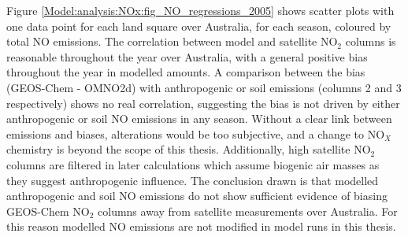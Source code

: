     Figure \ref{Model:analysis:NOx:fig_NO_regressions_2005} shows scatter plots with one data point for each land square over Australia, for each season, coloured by total NO emissions.
    The correlation between model and satellite NO$_2$ columns is reasonable throughout the year over Australia, with a general positive bias throughout the year in modelled amounts.
    A comparison between the bias (GEOS-Chem - OMNO2d) with anthropogenic or soil emissions (columns 2 and 3 respectively) shows no real correlation, suggesting the bias is not driven by either anthropogenic or soil NO emissions in any season.
    Without a clear link between emissions and biases, alterations would be too subjective, and a change to NO$_X$ chemistry is beyond the scope of this thesis.
    Additionally, high satellite NO$_2$ columns are filtered in later calculations which assume biogenic air masses as they suggest anthropogenic influence.
    The conclusion drawn is that modelled anthropogenic and soil NO emissions do not show sufficient evidence of biasing GEOS-Chem NO$_2$ columns away from satellite measurements over Australia.
    For this reason modelled NO emissions are not modified in model runs in this thesis.
    
    

